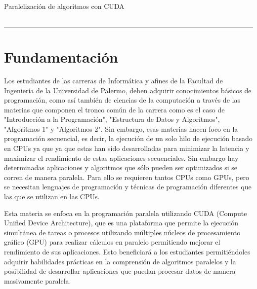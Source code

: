 



\begin{center}
    \LARGE\textbf{\coursename} \\
    \Large{Paralelización de algoritmos con CUDA} \\
    \normalsize{\currentsemester} \\
    \vspace{1em}
    \hrule
\end{center}

\vspace{1em}


\section*{Fundamentación}
Los estudiantes de las carreras de Informática y afines de la Facultad de Ingeniería de la Universidad de Palermo, deben
adquirir conocimientos básicos de programación, como así también de ciencias de la computación a través de las materias
que componen el tronco común de la carrera como es el caso de "Introducción a la Programación", "Estructura de Datos y
Algoritmos", "Algoritmos 1" y "Algoritmos 2". Sin embargo, esas materias hacen foco en la programación secuencial, es
decir, la ejecución de un solo hilo de ejecución basado en CPUs ya que ya que estas han sido desarrolladas para
minimizar la latencia y maximizar el rendimiento de estas aplicaciones secuenciales. Sin embargo hay determinadas
aplicaciones y algoritmos que sólo pueden ser optimizados si se corren de manera paralela. Para ello se requieren tantos
CPUs como GPUs, pero se necesitan lenguajes de programación y técnicas de programación diferentes que las que se
utilizan en las CPUs.

Esta materia se enfoca en la programación paralela utilizando CUDA (Compute Unified Device Architecture), que es una
plataforma que permite la ejecución simultánea de tareas o procesos utilizando múltiples núcleos de procesamiento
gráfico (GPU) para realizar cálculos en paralelo permitiendo mejorar el rendimiento de sus aplicaciones. Esto
beneficiará a los estudiantes permitiéndoles adquirir habilidades prácticas en la comprensión de algoritmos paralelos y
la posibilidad de desarrollar aplicaciones que puedan procesar datos de manera masivamente paralela.


